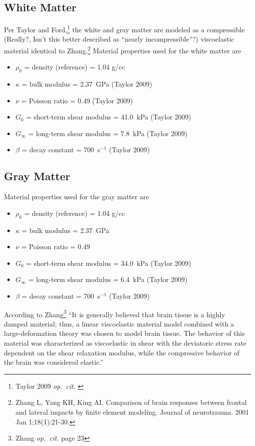 \documentclass[12pt,reqno]{amsart}
\newcommand{\opcit}{{\em op.~cit. }}
\begin{document}
\subsection{White Matter}
Per Taylor and Ford,\footnote{Taylor 2009 \opcit}
the white and gray matter are modeled as a compressible 
(Really?, Isn't this better described as ``nearly incompressible''?)
viscoelastic material identical to Zhang.\footnote{Zhang L, Yang KH, 
King AI. Comparison of brain responses between frontal and lateral impacts 
by finite element modeling. Journal of neurotrauma. 2001 Jan 1;18(1):21-30.}
Material properties used for the white matter are
\begin{itemize}
  \item $\rho_0$ = density (reference) = 1.04 g/cc
  \item $\kappa$ = bulk modulus = 2.37~GPa (Taylor 2009)
  \item $\nu$ = Poisson ratio = 0.49 (Taylor 2009)
  \item $G_0$ = short-term shear modulus = 41.0~kPa (Taylor 2009)
  \item $G_{\infty}$ = long-term shear modulus = 7.8~kPa (Taylor 2009)
  \item $\beta$ = decay constant = 700~s$^{-1}$ (Taylor 2009)
\end{itemize}

\subsection{Gray Matter}
Material properties used for the gray matter are
\begin{itemize}
  \item $\rho_0$ = density (reference) = 1.04 g/cc
  \item $\kappa$ = bulk modulus = 2.37~GPa 
  \item $\nu$ = Poisson ratio = 0.49
  \item $G_0$ = short-term shear modulus = 34.0~kPa (Taylor 2009)
  \item $G_{\infty}$ = long-term shear modulus = 6.4~kPa (Taylor 2009)
  \item $\beta$ = decay constant = 700~s$^{-1}$ (Taylor 2009)
\end{itemize}



According to Zhang\footnote{Zhang \opcit page 23}
``It is generally believed that brain tissue is a highly damped material;
thus, a linear viscoelastic material model combined with a large-deformation
theory was chosen to model brain tissue.  The behavior of this material
was characterized as viscoelastic in shear with the deviatoric stress
rate dependent on the shear relaxation modulus, while the compressive 
behavior of the brain was considered elastic.''
\end{document}
